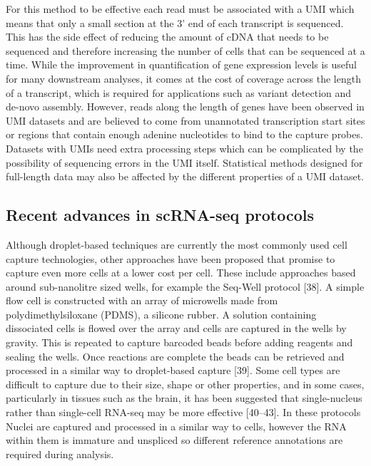 \documentclass[11pt,a4paper,titlepage,twoside,openright]{style/unimelbthesis}
\theoremstyle{definition}
\theoremstyle{definition}
\theoremstyle{definition}
\theoremstyle{remark}
\begin{document}
\begin{mainmatter}
For this method to be effective each read must be associated with a UMI which means that only a small section at the 3' end of each transcript is sequenced. This has the side effect of reducing the amount of cDNA that needs to be sequenced and therefore increasing the number of cells that can be sequenced at a time. While the improvement in quantification of gene expression levels is useful for many downstream analyses, it comes at the cost of coverage across the length of a transcript, which is required for applications such as variant detection and de-novo assembly. However, reads along the length of genes have been observed in UMI datasets and are believed to come from unannotated transcription start sites or regions that contain enough adenine nucleotides to bind to the capture probes. Datasets with UMIs need extra processing steps which can be complicated by the possibility of sequencing errors in the UMI itself. Statistical methods designed for full-length data may also be affected by the different properties of a UMI dataset.

\hypertarget{recent-advances-in-scrna-seq-protocols}{%
\subsection{Recent advances in scRNA-seq protocols}\label{recent-advances-in-scrna-seq-protocols}}

Although droplet-based techniques are currently the most commonly used cell capture technologies, other approaches have been proposed that promise to capture even more cells at a lower cost per cell. These include approaches based around sub-nanolitre sized wells, for example the Seq-Well protocol {[}38{]}. A simple flow cell is constructed with an array of microwells made from polydimethylsiloxane (PDMS), a silicone rubber. A solution containing dissociated cells is flowed over the array and cells are captured in the wells by gravity. This is repeated to capture barcoded beads before adding reagents and sealing the wells. Once reactions are complete the beads can be retrieved and processed in a similar way to droplet-based capture {[}39{]}. Some cell types are difficult to capture due to their size, shape or other properties, and in some cases, particularly in tissues such as the brain, it has been suggested that single-nucleus rather than single-cell RNA-seq may be more effective {[}40--43{]}. In these protocols Nuclei are captured and processed in a similar way to cells, however the RNA within them is immature and unspliced so different reference annotations are required during analysis.


\end{mainmatter}
\end{document}
